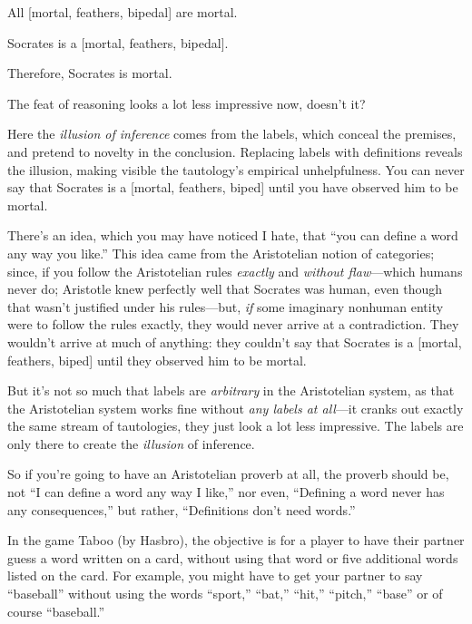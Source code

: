 {
 All [mortal, {\textlnot}feathers, bipedal] are mortal.}

{
 Socrates is a [mortal, {\textlnot}feathers, bipedal].}

{
 Therefore, Socrates is mortal.}

{
 The feat of reasoning looks a lot less impressive now,
doesn't it?}

{
 Here the \textit{illusion of inference} comes from the labels,
which conceal the premises, and pretend to novelty in the conclusion.
Replacing labels with definitions reveals the illusion, making visible
the tautology's empirical unhelpfulness. You can never
say that Socrates is a [mortal, {\textlnot}feathers, biped] until you
have observed him to be mortal.}

{
 There's an idea, which you may have noticed I
hate, that ``you can define a word any way you
like.'' This idea came from the Aristotelian notion
of categories; since, if you follow the Aristotelian rules
\textit{exactly} and \textit{without flaw}{}---which humans never do;
Aristotle knew perfectly well that Socrates was human, even though that
wasn't justified under his rules---but, \textit{if}
some imaginary nonhuman entity were to follow the rules exactly, they
would never arrive at a contradiction. They wouldn't
arrive at much of anything: they couldn't say that
Socrates is a [mortal, {\textlnot}feathers, biped] until they observed
him to be mortal.}

{
 But it's not so much that labels are
\textit{arbitrary} in the Aristotelian system, as that the Aristotelian
system works fine without \textit{any labels at all}{}---it cranks out
exactly the same stream of tautologies, they just look a lot less
impressive. The labels are only there to create the \textit{illusion}
of inference.}

{
 So if you're going to have an Aristotelian proverb
at all, the proverb should be, not ``I can define a
word any way I like,'' nor even,
``Defining a word never has any
consequences,'' but rather,
``Definitions don't need
words.''}

\myendsectiontext


{
 In the game Taboo (by Hasbro), the objective is for a player to
have their partner guess a word written on a card, without using that
word or five additional words listed on the card. For example, you
might have to get your partner to say
``baseball'' without using the words
``sport,''
``bat,''
``hit,''
``pitch,''
``base'' or of course
``baseball.'' }

